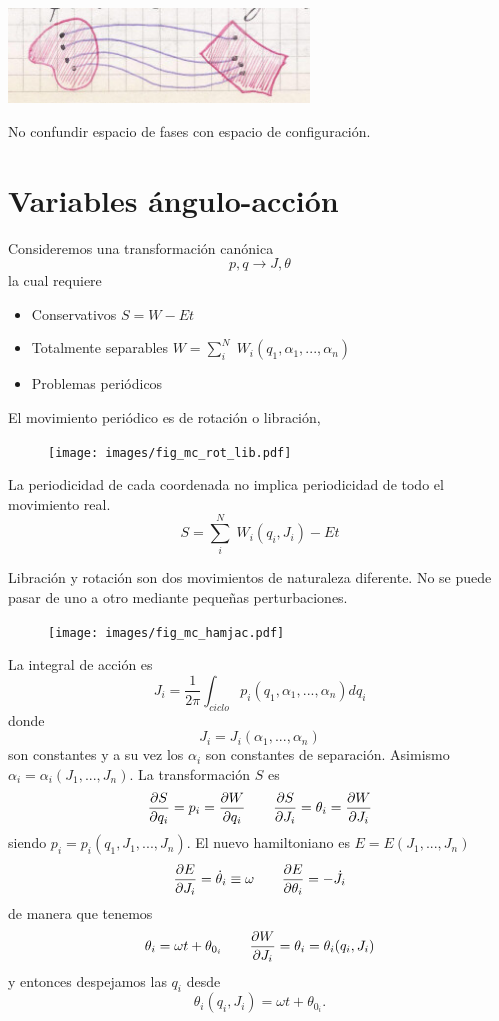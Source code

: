 \documentclass[10pt,oneside]{CBFT_book}
\begin{document}
\includegraphics[width=0.6\textwidth]{images/fig_mc_espacio_fases.jpg}	

No confundir espacio de fases con espacio de configuración.

\section{Variables ángulo-acción}

Consideremos una transformación canónica 
\[
	p,q \longrightarrow J,\theta
\]
la cual requiere
\begin{itemize}
 \item Conservativos $S = W - Et $
 \item Totalmente separables $W = \sum_i^N \; W_i(q_1,\alpha_1,...,\alpha_n)$
 \item Problemas periódicos
\end{itemize}

El movimiento periódico es de rotación o libración,
\begin{figure}[htb]
	\begin{center}
	\texttt{[image: images/fig\_mc\_rot\_lib.pdf]}	 
	\end{center}
	\caption{}
\end{figure} 

La periodicidad de cada coordenada no implica periodicidad de todo el movimiento real.
\[
	S = \sum_i^N \; W_i(q_i,J_i) - Et
\]

Libración y rotación son dos movimientos de naturaleza diferente. No se puede pasar de
uno a otro mediante pequeñas perturbaciones.

\begin{figure}
	\begin{center}
	\texttt{[image: images/fig\_mc\_hamjac.pdf]}	 
	\end{center}
	\caption{}
\end{figure} 

La integral de acción es
\[
	J_i = \frac{1}{2\pi}\int_{ciclo} p_i(q_1,\alpha_1,...,\alpha_n) dq_i
\]
donde 
\[
	J_i = J_i(\alpha_1,...,\alpha_n)
\]
son constantes y a su vez los $\alpha_i$ son constantes de separación.
Asimismo $\alpha_i=\alpha_i(J_1,...,J_n)$. 
La transformación $S$ es 
\[
	\frac{\partial^{\hspace{-0.05em}} {S}}{\partial {q_i}^{\hspace{-0.05em}}} = p_i = \frac{\partial^{\hspace{-0.05em}} {W}}{\partial {q_i}^{\hspace{-0.05em}}} \qquad \frac{\partial^{\hspace{-0.05em}} {S}}{\partial {J_i}^{\hspace{-0.05em}}} = \theta_i = \frac{\partial^{\hspace{-0.05em}} {W}}{\partial {J_i}^{\hspace{-0.05em}}}
\]
siendo $p_i = p_i(q_1,J_1,...,J_n)$.
El nuevo hamiltoniano es $E=E(J_1,...,J_n)$
\[
	\frac{\partial^{\hspace{-0.05em}} {E}}{\partial {J_i}^{\hspace{-0.05em}}} = \dot{\theta}_i \equiv \omega \qquad \frac{\partial^{\hspace{-0.05em}} {E}}{\partial {\theta_i}^{\hspace{-0.05em}}} = -\dot{J}_i
\]
de manera que tenemos
\[
	\theta_i = \omega t + \theta_{0_i} \qquad  \frac{\partial^{\hspace{-0.05em}} {W}}{\partial {J_i}^{\hspace{-0.05em}}} = \theta_i = \theta_i(q_i, J_i)
\]
y entonces despejamos las $q_i$ desde
\[
	\theta_i(q_i, J_i) = \omega t + \theta_{0_i}.
\]
\end{document}
